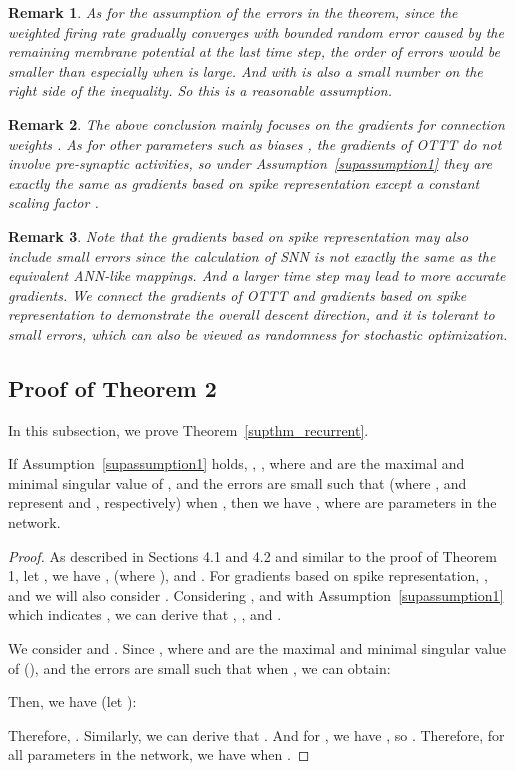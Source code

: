\documentclass{article}
\begin{document}
\newtheorem{remark}{\bf Remark}
\begin{remark}
As for the assumption of the errors in the theorem, since the weighted firing rate gradually converges  with bounded random error caused by the remaining membrane potential at the last time step, the order of errors  would be smaller than  especially when  is large. And  with  is also a small number on the right side of the inequality. So this is a reasonable assumption.
\end{remark}

\begin{remark}
The above conclusion mainly focuses on the gradients for connection weights . As for other parameters such as biases , the gradients of OTTT do not involve pre-synaptic activities, so under Assumption~\ref{supassumption1} they are exactly the same as gradients based on spike representation except a constant scaling factor .
\end{remark}

\begin{remark}
Note that the gradients based on spike representation may also include small errors since the calculation of SNN is not exactly the same as the equivalent ANN-like mappings. And a larger time step may lead to more accurate gradients. We connect the gradients of OTTT and gradients based on spike representation to demonstrate the overall descent direction, and it is tolerant to small errors, which can also be viewed as randomness for stochastic optimization.
\end{remark}

\subsection{Proof of Theorem 2}

In this subsection, we prove Theorem~\ref{supthm_recurrent}. 

\begin{supthm}\label{supthm_recurrent}
If Assumption~\ref{supassumption1} holds, , , where  and  are the maximal and minimal singular value of , and the errors  are small such that  (where ,  and  represent  and , respectively) when , then we have , where  are parameters in the network.
\end{supthm}

\begin{proof}

As described in Sections 4.1 and 4.2 and similar to the proof of Theorem 1, let , we have ,  (where ), and . For gradients based on spike representation, , and we will also consider . Considering , 
and with Assumption~\ref{supassumption1} which indicates , we can derive that , , and .

We consider  and . Since , where  and  are the maximal and minimal singular value of  (), and the errors  are small such that  when , we can obtain: 


Then, we have (let ): 


Therefore, . Similarly, we can derive that . And for , we have , so . Therefore, for all parameters  in the network, we have  when .

\end{proof}
\end{document}

